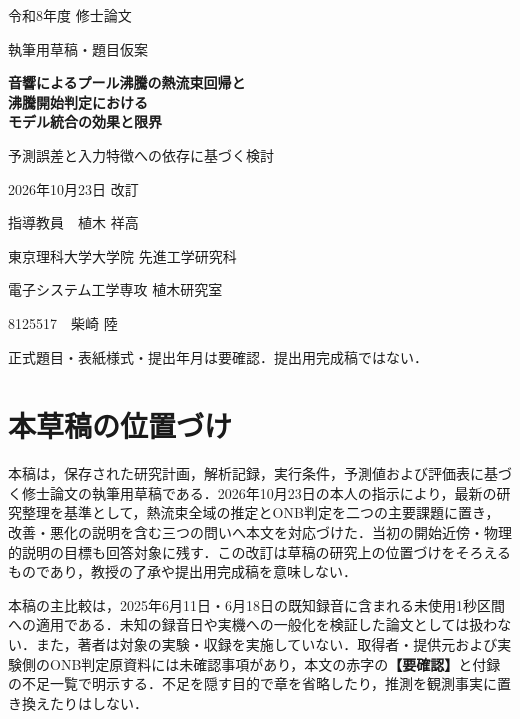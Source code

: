 \begin{titlepage}
\centering
\vspace*{9mm}
{\Large 令和8年度 修士論文\par}
\vspace{9mm}
{\large 執筆用草稿・題目仮案\par}
\vspace{13mm}
{\LARGE\bfseries 音響によるプール沸騰の熱流束回帰と\\[3mm]
沸騰開始判定における\\[3mm]
モデル統合の効果と限界\par}
\vspace{9mm}
{\large 予測誤差と入力特徴への依存に基づく検討\par}
\vfill
{\large 2026年10月23日 改訂\par}
\vspace{8mm}
{\large 指導教員　植木 祥高\par}
\vspace{8mm}
{\large 東京理科大学大学院 先進工学研究科\par}
{\large 電子システム工学専攻 植木研究室\par}
\vspace{5mm}
{\large 8125517　柴崎 陸\par}
\vspace{10mm}
{\small 正式題目・表紙様式・提出年月は要確認．提出用完成稿ではない．\par}
\end{titlepage}
\chapter*{本草稿の位置づけ}
本稿は，保存された研究計画，解析記録，実行条件，予測値および評価表に基づく修士論文の執筆用草稿である．2026年10月23日の本人の指示により，最新の研究整理を基準として，熱流束全域の推定とONB判定を二つの主要課題に置き，改善・悪化の説明を含む三つの問いへ本文を対応づけた．当初の開始近傍・物理的説明の目標も回答対象に残す．この改訂は草稿の研究上の位置づけをそろえるものであり，教授の了承や提出用完成稿を意味しない．

本稿の主比較は，2025年6月11日・6月18日の既知録音に含まれる未使用1秒区間への適用である．未知の録音日や実機への一般化を検証した論文としては扱わない．また，著者は対象の実験・収録を実施していない．取得者・提供元および実験側のONB判定原資料には未確認事項があり，本文の赤字の\textbf{【要確認】}と付録の不足一覧で明示する．不足を隠す目的で章を省略したり，推測を観測事実に置き換えたりはしない．

